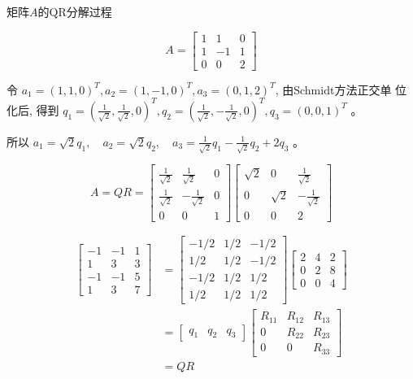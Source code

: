 \begin{example}
    矩阵$A$的QR分解过程

    $$ A=\left[\begin{array}{ccc}1 & 1 & 0 \\ 1 & -1 & 1 \\ 0 & 0 & 2\end{array}\right] $$

    令 $ a_{1}=(1,1,0)^{T}, a_{2}=(1,-1,0)^{T}, a_{3}=(0,1,2)^{T} $, 由Schmidt方法正交单 位化后, 得到 $ q_{1}=\left(\frac{1}{\sqrt{2}}, \frac{1}{\sqrt{2}}, 0\right)^{T}, q_{2}=\left(\frac{1}{\sqrt{2}},-\frac{1}{\sqrt{2}}, 0\right)^{T}, q_{3}=(0,0,1)^{T} $ 。

    所以 $ a_{1}=\sqrt{2} q_{1}, \quad a_{2}=\sqrt{2} q_{2}, \quad a_{3}=\frac{1}{\sqrt{2}} q_{1}-\frac{1}{\sqrt{2}} q_{2}+2 q_{3} $ 。

    $$ A=Q R=\left[\begin{array}{ccc}\frac{1}{\sqrt{2}} & \frac{1}{\sqrt{2}} & 0 \\ \frac{1}{\sqrt{2}} & -\frac{1}{\sqrt{2}} & 0 \\ 0 & 0 & 1\end{array}\right]\left[\begin{array}{ccc}\sqrt{2} & 0 & \frac{1}{\sqrt{2}} \\ 0 & \sqrt{2} & -\frac{1}{\sqrt{2}} \\ 0 & 0 & 2\end{array}\right] $$

    $$ \begin{aligned}\left[\begin{array}{rrr}-1 & -1 & 1 \\ 1 & 3 & 3 \\ -1 & -1 & 5 \\ 1 & 3 & 7\end{array}\right] &=\left[\begin{array}{rrr}-1 / 2 & 1 / 2 & -1 / 2 \\ 1 / 2 & 1 / 2 & -1 / 2 \\ -1 / 2 & 1 / 2 & 1 / 2 \\ 1 / 2 & 1 / 2 & 1 / 2\end{array}\right]\left[\begin{array}{ccc}2 & 4 & 2 \\ 0 & 2 & 8 \\ 0 & 0 & 4\end{array}\right] \\ &=\left[\begin{array}{lll}q_{1} & q_{2} & q_{3}\end{array}\right]\left[\begin{array}{ccc}R_{11} & R_{12} & R_{13} \\ 0 & R_{22} & R_{23} \\ 0 & 0 & R_{33}\end{array}\right] \\ &=Q R \end{aligned} $$
\end{example}

